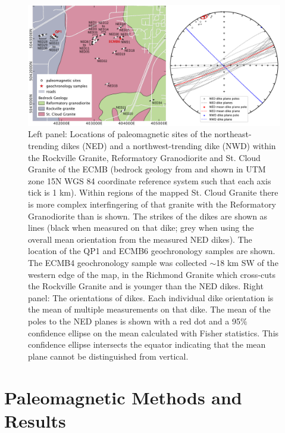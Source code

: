 \documentclass[draft]{agujournal2019}
\begin{document}
\begin{figure}[!ht]
\centering
\noindent\includegraphics[width=\textwidth]{./figures/map_sites.pdf}
\caption{\small{Left panel: Locations of paleomagnetic sites of the northeast-trending dikes (NED) and a northwest-trending dike (NWD) within the Rockville Granite, Reformatory Granodiorite and St. Cloud Granite of the ECMB (bedrock geology from  and shown in UTM zone 15N WGS 84 coordinate reference system such that each axis tick is 1 km). Within regions of the mapped St. Cloud Granite there is more complex interfingering of that granite with the Reformatory Granodiorite than is shown. The strikes of the dikes are shown as lines (black when measured on that dike; grey when using the overall mean orientation from the measured NED dikes). The location of the QP1 and ECMB6 geochronology samples are shown. The ECMB4 geochronology sample was collected $\sim$18 km SW of the western edge of the map, in the Richmond Granite which cross-cuts the Rockville Granite and is younger than the NED dikes. Right panel: The orientations of dikes. Each individual dike orientation is the mean of multiple measurements on that dike. The mean of the poles to the NED planes is shown with a red dot and a 95$\%$ confidence ellipse on the mean calculated with Fisher statistics. This confidence ellipse intersects the equator indicating that the mean plane cannot be distinguished from vertical.}}
\label{fig:site_map}
\end{figure}

\section{Paleomagnetic Methods and Results}
\end{document}
